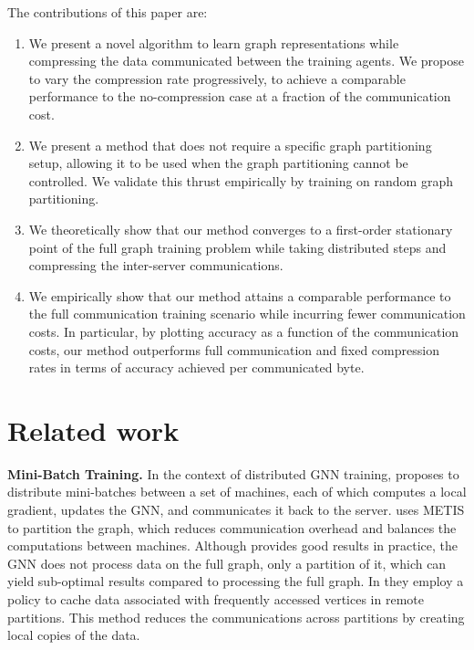 \documentclass[lettersize,journal]{IEEEtran}
\begin{document}
The contributions of this paper are:
\begin{enumerate}
	\item We present a novel algorithm to learn graph representations while compressing the data communicated between the training agents. We propose to vary the compression rate progressively, to achieve a comparable performance to the no-compression case at a fraction of the communication cost. 
    \item We present a method that does not require a specific graph partitioning setup, allowing it to be used when the graph partitioning cannot be controlled. We validate this thrust empirically by training on random graph partitioning. 
	\item We theoretically show that our method converges to a first-order stationary point of the full graph training problem while taking distributed steps and compressing the inter-server communications. 
	\item We empirically show that our method attains a comparable performance to the full communication training scenario while incurring fewer communication costs. In particular, by plotting accuracy as a function of the communication costs, our method outperforms full communication and fixed compression rates in terms of accuracy achieved per communicated byte. 
\end{enumerate}
\section*{Related work}
\textbf{Mini-Batch Training.} In the context of distributed GNN training, \cite{zheng2020distdgl} proposes to distribute mini-batches between a set of machines, each of which computes a local gradient, updates the GNN, and communicates it back to the server. \cite{zheng2020distdgl} uses METIS \cite{karypis1998fast} to partition the graph, which reduces communication overhead and balances the computations between machines. Although \cite{zheng2020distdgl} provides good results in practice, the GNN does not process data on the full graph, only a partition of it, which can yield sub-optimal results compared to processing the full graph.
In \cite{kaler2023communication} they employ a policy to cache data associated with frequently accessed vertices in remote partitions. This method reduces the communications across partitions by creating local copies of the data.  
\end{document}
